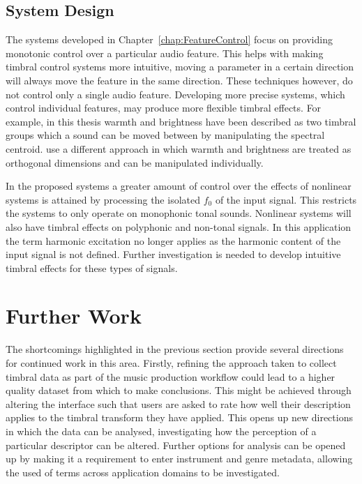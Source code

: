 	\subsection{System Design}
	\label{sec:Conclusion-Critique-SystemDesign}
		The systems developed in Chapter~\ref{chap:FeatureControl} focus on providing monotonic control over a
		particular audio feature. This helps with making timbral control systems more intuitive, moving a parameter
		in a certain direction will always move the feature in the same direction. These techniques however, do not
		control only a single audio feature. Developing more precise systems, which control individual features, may
		produce more flexible timbral effects. For example, in this thesis warmth and brightness have been described
		as two timbral groups which a sound can be moved between by manipulating the spectral centroid.
		\cite{zacharakis2011an} use a different approach in which warmth and brightness are treated as orthogonal
		dimensions and can be manipulated individually.

		In the proposed systems a greater amount of control over the effects of nonlinear systems is attained by
		processing the isolated $f_{0}$ of the input signal. This restricts the systems to only operate on
		monophonic tonal sounds. Nonlinear systems will also have timbral effects on polyphonic and non-tonal
		signals. In this application the term harmonic excitation no longer applies as the harmonic content of the
		input signal is not defined. Further investigation is needed to develop intuitive timbral effects for these
		types of signals.

\section{Further Work}
\label{sec:Conclusion-FurtherWork}
	The shortcomings highlighted in the previous section provide several directions for continued work in this area.
	Firstly, refining the approach taken to collect timbral data as part of the music production workflow could lead to
	a higher quality dataset from which to make conclusions. This might be achieved through altering the interface such
	that users are asked to rate how well their description applies to the timbral transform they have applied. This
	opens up new directions in which the data can be analysed, investigating how the perception of a particular
	descriptor can be altered. Further options for analysis can be opened up by making it a requirement to enter
	instrument and genre metadata, allowing the used of terms across application domains to be investigated.

